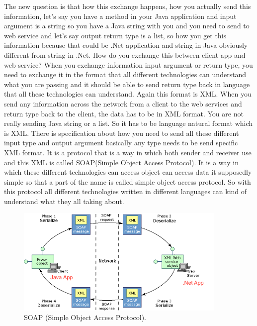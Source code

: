 The new question is that how this exchange happens, how you actually send this information, let’s say you have a method in your Java application and input argument is a string so you have a Java string with you and you need to send to web service and let’s say output return type is a list, so how you get this information because that could be .Net application and string in Java obviously different from string in .Net. How do you exchange this between client app and web service?  When you exchange information input argument or return type, you need to exchange it in the format that all different technologies can understand what you are passing and it should be able to send return type back in language that all these technologies can understand. Again this format is XML. When you send any information across the network from a client to the web services and
return type back to the client, the data has to be in XML format. You are not really sending Java string or a list. So it has to be language natural format which is XML. There is specification about how you need to send all these different input type and output argument basically any type needs to be send specific XML format. It is a protocol that is a way in which both sender and receiver use and this XML is called SOAP(Simple Object Access Protocol). It is a way in which these different technologies can access object can access data it supposedly simple so that a part of the name is called simple object access protocol. So with this protocol all different technologies written in different languages can kind of understand what they all taking about.

\begin{figure}[!htb]
  \centering
  \includegraphics[width=0.9\textwidth]{Figures/soap.png}
  \caption[SOAP (Simple Object Access Protocol).]{SOAP (Simple Object Access Protocol).}
  \label{fig:wsdl}
\end{figure}

